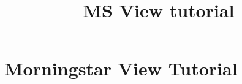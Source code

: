 \documentclass[a4paper,12pt]{report}
\begin{document}
\title{MS View tutorial}
\maketitle
\tableofcontents %
\chapter{Morningstar View Tutorial}



\setcounter{page}{2} %
\end{document}
